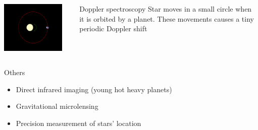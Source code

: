 \documentclass[aspectratio=169]{beamer}
\begin{document}
\begin{frame}
\begin{columns}
\includegraphics[width=0.90\textwidth]{img/Dopplerspectr-above.png}
\begin{block}{Doppler spectroscopy}
Star moves in a small circle when it is orbited by a planet. These movements causes
a tiny periodic Doppler shift 
\end{block}
\end{columns}
\begin{block}{Others}
\begin{itemize}
\item Direct infrared imaging (young hot heavy planets)
\item Gravitational microlensing
\item Precision measurement of stars' location
\end{itemize}
\end{block}
\end{frame}
\end{document}
